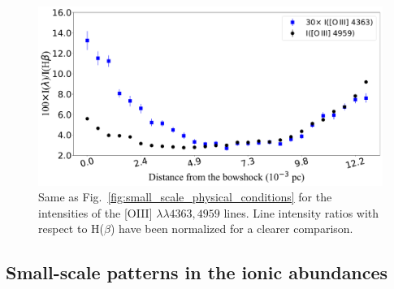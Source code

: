 \documentclass[twocolumn]{aastex63}
\begin{document}
\begin{figure}
\centering
\includegraphics[width=\columnwidth]{O3lines_distribution.pdf}
\caption{Same as Fig.~\ref{fig:small_scale_physical_conditions} for the intensities of the [O\thinspace III] $\lambda \lambda 4363, 4959$ lines. Line intensity ratios with respect to H($\beta$) have been normalized for a clearer comparison.}
\label{fig:O3_lines}
\end{figure}






\subsection{Small-scale patterns in the ionic abundances}
\label{subsec:small_scale_ca}
\end{document}
